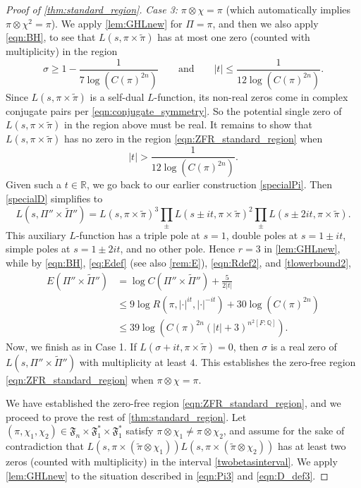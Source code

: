\documentclass[12pt]{amsart}
\theoremstyle{definition}
\theoremstyle{remark}
\numberwithin{equation}{section}
\theoremstyle{plain}
\renewcommand{\tilde}{\widetilde}
\newcommand{\Q}{\mathbb{Q}}
\newcommand{\R}{\mathbb{R}}
\begin{document}
\begin{proof}[Proof of \cref{thm:standard_region}]
\emph{Case 3:} $\pi\otimes\chi=\pi$ (which automatically implies $\pi\otimes\chi^2=\pi$). We apply \cref{lem:GHLnew} for $\Pi=\pi$, and then we also apply \eqref{eqn:BH}, to see that $L(s,\pi\times\tilde\pi)$ has at most one zero (counted with multiplicity) in the region
\[
\sigma\geq 1-\frac{1}{7\log(C(\pi)^{2n})}
\qquad\text{and}\qquad
|t|\leq\frac{1}{12\log(C(\pi)^{2n})}.
\]
Since $L(s,\pi\times\tilde{\pi})$ is a self-dual $L$-function, its non-real zeros come in complex conjugate pairs per \eqref{eqn:conjugate_symmetry}.  So the potential single zero of $L(s,\pi\times\tilde{\pi})$ in the region above must be real. It remains to show that $L(s,\pi\times\tilde{\pi})$ has no zero in the region \eqref{eqn:ZFR_standard_region} when
\begin{equation}
\label{tlowerbound2}
|t|>\frac{1}{12\log(C(\pi)^{2n})}.
\end{equation}
Given such a $t\in\R$, we go back to our earlier construction \eqref{specialPi}. Then \eqref{specialD} simplifies to
\[
L(s,\Pi''\times\tilde{\Pi}'')=
L(s,\pi\times\tilde\pi)^3\prod_{\pm}L(s\pm it,\pi\times\tilde\pi)^2\prod_{\pm} L(s\pm 2it,\pi\times\tilde\pi).
\]
This auxiliary $L$-function has a triple pole at $s=1$, double poles at $s=1\pm it$, simple poles at $s=1\pm 2it$, and no other pole.  Hence $r=3$ in \cref{lem:GHLnew}, while by \eqref{eqn:BH}, \eqref{eq:Edef} (see also \cref{rem:E}), \eqref{eqn:Rdef2}, and \eqref{tlowerbound2},
\begin{align*}
E(\Pi''\times\tilde{\Pi}'')
&=\log C(\Pi''\times\tilde{\Pi}'')+\frac{5}{2|t|}\\
&\leq 9\log R(\pi,|\cdot|^{it},|\cdot|^{-it})+30\log(C(\pi)^{2n})\\
&\leq 39\log(C(\pi)^{2n}(|t|+3)^{n^2[F:\Q]}).
\end{align*}
Now, we finish as in Case 1. If $L(\sigma+it,\pi\times\tilde{\pi})=0$, then $\sigma$ is a real zero of $L(s,\Pi''\times\tilde{\Pi}'')$ with multiplicity at least $4$.  This establishes the zero-free region \eqref{eqn:ZFR_standard_region} when $\pi\otimes\chi=\pi$.

We have established the zero-free region \eqref{eqn:ZFR_standard_region}, and we proceed to prove the rest of \cref{thm:standard_region}.  Let $(\pi,\chi_1,\chi_2)\in\mathfrak{F}_n\times\mathfrak{F}_1^*\times\mathfrak{F}_1^*$ satisfy $\pi\otimes\chi_1\neq\pi\otimes\chi_2$, and assume for the sake of contradiction that $L(s,\pi\times(\tilde{\pi}\otimes\chi_1))L(s,\pi\times(\tilde{\pi}\otimes\chi_2))$ has at least two zeros (counted with multiplicity) in the interval \eqref{twobetasinterval}.  We apply \cref{lem:GHLnew} to the situation described in \eqref{eqn:Pi3} and \eqref{eqn:D_def3}.


\end{proof}
\end{document}
